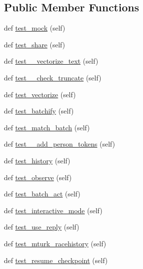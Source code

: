 \subsection*{Public Member Functions}
\begin{DoxyCompactItemize}
\item 
def \hyperlink{classtests_1_1test__torch__agent_1_1TestTorchAgent_a0a7c1df7d947bdc260afa6dad21d78b9}{test\+\_\+mock} (self)
\item 
def \hyperlink{classtests_1_1test__torch__agent_1_1TestTorchAgent_af3d1c7681a30a06684117464ccefb15d}{test\+\_\+share} (self)
\item 
def \hyperlink{classtests_1_1test__torch__agent_1_1TestTorchAgent_a9bce672782a5d1408c104fd89d2d403f}{test\+\_\+\+\_\+vectorize\+\_\+text} (self)
\item 
def \hyperlink{classtests_1_1test__torch__agent_1_1TestTorchAgent_ab5ef383cb36b970850bb3e171c832f36}{test\+\_\+\+\_\+check\+\_\+truncate} (self)
\item 
def \hyperlink{classtests_1_1test__torch__agent_1_1TestTorchAgent_a551847086a9d8bf6bc04ea1efeacf608}{test\+\_\+vectorize} (self)
\item 
def \hyperlink{classtests_1_1test__torch__agent_1_1TestTorchAgent_aad1075dad0c291b524d84ec9526177dd}{test\+\_\+batchify} (self)
\item 
def \hyperlink{classtests_1_1test__torch__agent_1_1TestTorchAgent_abe59ca8c2f6927c0ba6f0e5ce7d3a4f2}{test\+\_\+match\+\_\+batch} (self)
\item 
def \hyperlink{classtests_1_1test__torch__agent_1_1TestTorchAgent_a81c474c311d1825377b107d40d567d8a}{test\+\_\+\+\_\+add\+\_\+person\+\_\+tokens} (self)
\item 
def \hyperlink{classtests_1_1test__torch__agent_1_1TestTorchAgent_a3c5504828399a2bb0d776baf1a744f71}{test\+\_\+history} (self)
\item 
def \hyperlink{classtests_1_1test__torch__agent_1_1TestTorchAgent_ae3b6e4145176ba5d5e9179756d064332}{test\+\_\+observe} (self)
\item 
def \hyperlink{classtests_1_1test__torch__agent_1_1TestTorchAgent_aed82743e884c933453d912cfa8c7ec7f}{test\+\_\+batch\+\_\+act} (self)
\item 
def \hyperlink{classtests_1_1test__torch__agent_1_1TestTorchAgent_aadf263b222e27bfd83d568148683a8e0}{test\+\_\+interactive\+\_\+mode} (self)
\item 
def \hyperlink{classtests_1_1test__torch__agent_1_1TestTorchAgent_a10ba6e3fdb49b540bc4663d9c7a30eab}{test\+\_\+use\+\_\+reply} (self)
\item 
def \hyperlink{classtests_1_1test__torch__agent_1_1TestTorchAgent_a9954f92efc8cc7a9770f90f3a297d397}{test\+\_\+mturk\+\_\+racehistory} (self)
\item 
def \hyperlink{classtests_1_1test__torch__agent_1_1TestTorchAgent_a7135ee3421b1d0fc98f0202718910482}{test\+\_\+resume\+\_\+checkpoint} (self)
\end{DoxyCompactItemize}


